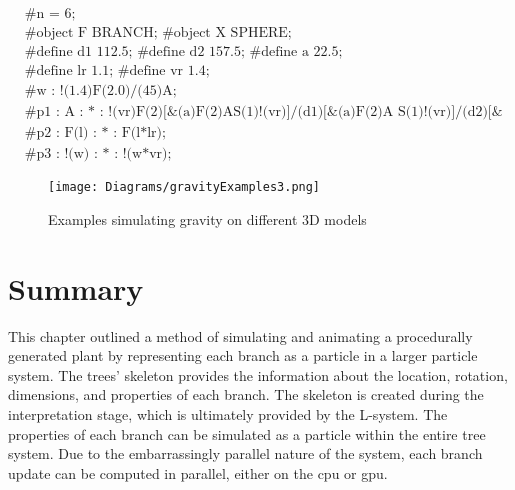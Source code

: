 \begin{singlespace}
\begin{equation}
\begin{aligned}
	&\textrm{\#n = 6;} \\
	&\textrm{\#object F BRANCH; \#object X SPHERE;}\\
	&\textrm{\#define d1 112.5; \#define d2 157.5; \#define a 22.5;}\\
	&\textrm{\#define lr 1.1; \#define vr 1.4;}\\
	&\textrm{\#w : !(1.4)F(2.0)/(45)A;}\\
	&\textrm{\#p1 : A : * : !(vr)F(2)[\&(a)F(2)AS(1)!(vr)]/(d1)[\&(a)F(2)A S(1)!(vr)]/(d2)[\&(a)F(2)A S(1)!(vr);}\\
	&\textrm{\#p2 : F(l) : * : F(l*lr);}\\
	&\textrm{\#p3 : !(w) : * : !(w*vr);}
\end{aligned}
\end{equation}
\end{singlespace}

\begin{figure}[htbp]
	{\centering
		\vspace{7px}
		\texttt{[image: Diagrams/gravityExamples3.png]}
		\label{3DAxisFigure} \label{Gravity applied to generated models}
		\caption{Examples simulating gravity on different 3D models}
	}
\end{figure}
\FloatBarrier

\section{Summary}

This chapter outlined a method of simulating and animating a procedurally generated plant by representing each branch as a  particle in a larger particle system. The trees' skeleton provides the information about the location, rotation, dimensions, and properties of each branch. The skeleton is created during the interpretation stage, which is ultimately provided by the L-system. The properties of each branch can be simulated as a particle within the entire tree system. Due to the embarrassingly parallel nature of the system, each branch update can be computed in parallel, either on the \acrshort{cpu} or \acrshort{gpu}.    

